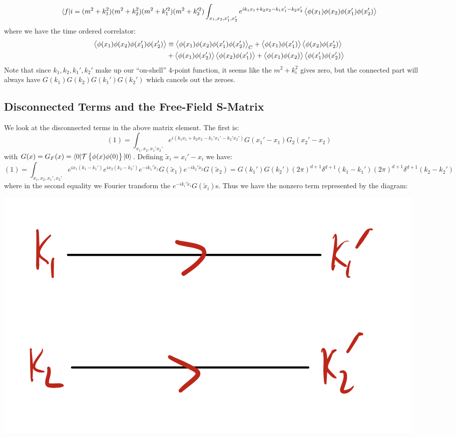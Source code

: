 \begin{equation}
    \langle f \rvert{i} = (m^2 + k_1^2)(m^2 + k_2^2)(m^2 + k_1'^2)(m^2 + k_2'^2)\int_{x_1, x_2, x_1', x_2'}e^{ik_1x_1 + k_2x_2 - k_1x_1' - k_2x_2'}\left< \phi(x_1)\phi(x_2)\phi(x_1')\phi(x_2') \right>
\end{equation}
where we have the time ordered correlator:
\begin{equation}
    \begin{split}
        \left< \phi(x_1)\phi(x_2)\phi(x_1')\phi(x_2') \right> &\equiv \left< \phi(x_1)\phi(x_2)\phi(x_1')\phi(x_2') \right>_C 
        + \left< \phi(x_1)\phi(x_1') \right>\left< \phi(x_2)\phi(x_2') \right> 
        \\ &+ \left< \phi(x_1)\phi(x_2') \right>\left< \phi(x_2)\phi(x_1') \right> + \left< \phi(x_1)\phi(x_2) \right>\left< \phi(x_1')\phi(x_2') \right> 
    \end{split}
\end{equation}
Note that since $k_1, k_2, k_1', k_2'$ make up our ``on-shell'' 4-point function, it seems like the $m^2 + k_i^2$ gives zero, but the connected part will always have $G(k_1)G(k_2)G(k_1')G(k_2')$ which cancels out the zeroes.

\subsection{Disconnected Terms and the Free-Field S-Matrix}
We look at the disconnected terms in the above matrix element. The first is:
\begin{equation}
    (1) = \int_{x_1, x_2, x_1' x_2'}e^{i(k_1x_1 + k_2x_2 - k_1'x_1' - k_2'x_2')}G(x_1' - x_1) G_2(x_2' - x_2)
\end{equation}
with $G(x) = G_F(x) = \langle 0 \rvert\mathcal{T}\set{\phi(x)\phi(0)}\lvert 0 \rangle$. Defining $\tilde{x}_i = x_i' - x_i$ we have:
\begin{equation}
    (1) = \int_{x_1, x_2, x_1', x_2'}e^{ix_1(k_1 - k_1')}e^{ix_2(k_2 - k_2')}e^{-ik_1'\tilde{x}_1}G(\tilde{x}_1)e^{-ik_2'\tilde{x}_2}G(\tilde{x}_2) = G(k_1')G(k_2')(2\pi)^{d+1}\delta^{d+1}(k_1-k_1')(2\pi)^{d+1}\delta^{d+1}(k_2 - k_2'
    )
\end{equation}
where in the second equality we Fourier transform the $e^{-ik_i'\tilde{x}_i}G(\tilde{x}_i)$s. Thus we have the nonzero term represented by the diagram:

\begin{center}
    \includegraphics[scale=0.35]{Lectures/Figures/lec17-stay.png}
\end{center}


